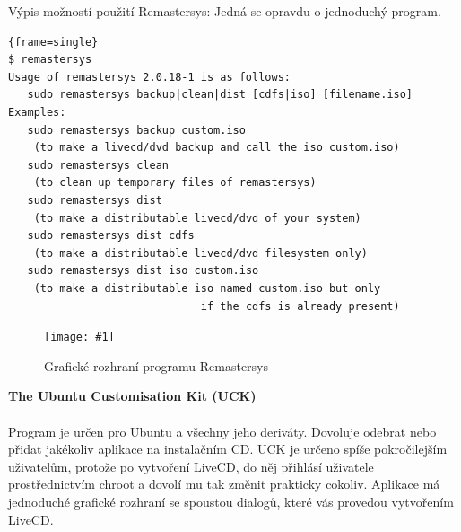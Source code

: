 \documentclass[a4paper,12pt]{article}
\newcommand{\nadpis}[1]{%
	\vspace{4 mm}
	\textbf{#1}\\
	\vspace{4 mm}
	}
\newcommand{\obr}[3]{%
	\begin{figure}[h]
	\center\texttt{[image: \#1]}
	\caption{#3}
	\end{figure}
	}
\newenvironment{codeframe}{%
  \begin{Sbox} 
    \begin{minipage} 
      {\columnwidth-\leftmargin-\rightmargin-2\fboxsep-2\fboxrule-4pt} 
}{%

  \end{minipage} 
  \end{Sbox} 
  \begin{center} 
    \fcolorbox{black}{codeback}{\TheSbox} 
  \end{center} 
}
\begin{document}
Výpis možností použití Remastersys: Jedná se opravdu o jednoduchý program.
    \begin{codeframe} 
\begin{Verbatim}{frame=single} 
$ remastersys
Usage of remastersys 2.0.18-1 is as follows:
   sudo remastersys backup|clean|dist [cdfs|iso] [filename.iso]
Examples:
   sudo remastersys backup custom.iso
    (to make a livecd/dvd backup and call the iso custom.iso)
   sudo remastersys clean
    (to clean up temporary files of remastersys)
   sudo remastersys dist
    (to make a distributable livecd/dvd of your system)
   sudo remastersys dist cdfs
    (to make a distributable livecd/dvd filesystem only)
   sudo remastersys dist iso custom.iso
    (to make a distributable iso named custom.iso but only
                              if the cdfs is already present)
\end{Verbatim} 
    \end{codeframe} 
\begin{center}
\obr{./img/screens/remastersys.png}{0.5}{Grafické rozhraní programu Remastersys}
\end{center}
\nadpis{The Ubuntu Customisation Kit (UCK)}\\ \label{sec:UCK}
Program je určen pro Ubuntu a všechny jeho deriváty. Dovoluje odebrat nebo přidat jakékoliv aplikace na instalačním CD. UCK je určeno spíše pokročilejším uživatelům, protože po vytvoření LiveCD, do něj přihlásí uživatele prostřednictvím chroot a dovolí mu tak změnit prakticky cokoliv. Aplikace má jednoduché grafické rozhraní se spoustou dialogů, které vás provedou vytvořením LiveCD.\cite{Linux_Build}
\end{document}
